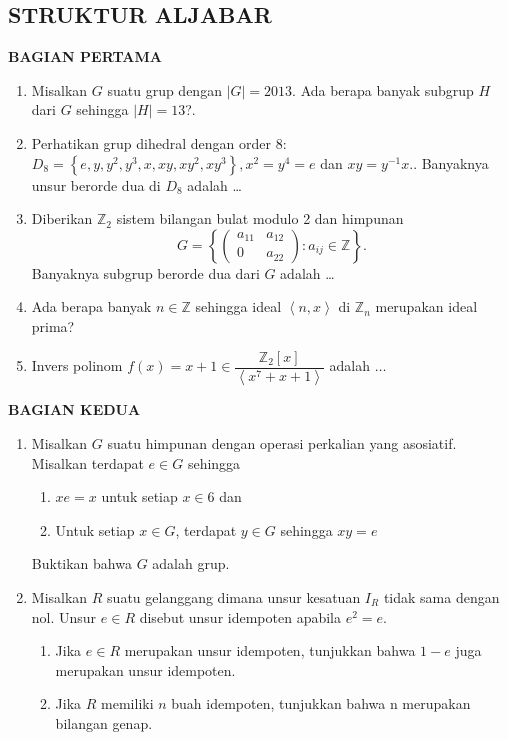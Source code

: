 \documentclass[12pt,twoside]{article}
\begin{document}
\subsection{STRUKTUR ALJABAR}
\textbf{BAGIAN PERTAMA}
\begin{enumerate}
	\item Misalkan $G$ suatu grup dengan $|G|=2013.$ Ada berapa banyak subgrup $H$ dari $G$ sehingga $|H|=13$?.

	\item Perhatikan grup dihedral dengan order 8: 	$D_8 = \left\lbrace e,y,y^2,y^3,x,xy,xy^2,xy^3 \right\rbrace, x^2=y^4=e$ dan $xy=y^{-1}x.$. Banyaknya unsur berorde dua di $D_8$ adalah \dots

	\item Diberikan $\mathbb{Z}_2$ sistem bilangan bulat modulo 2 dan himpunan $$G = \left\lbrace \left( \begin{array}{cc}
				      a_{11} & a_{12} \\0&a_{22}
			      \end{array}\right) : a_{ij} \in \mathbb{Z} \right\rbrace.$$ Banyaknya subgrup berorde dua dari $G$ adalah \dots

	\item Ada berapa banyak $n\in \mathbb{Z}$ sehingga ideal $\left< n,x \right>$ di $\mathbb{Z}_n$ merupakan ideal prima?

	\item Invers polinom $f(x) = x+1 \in \dfrac{\mathbb{Z}_{2}[x]}{\left<x^7 + x + 1\right>}$ adalah $\dots$

\end{enumerate}
\newpage \textbf{BAGIAN KEDUA}
\begin{enumerate}
	\item Misalkan $G$ suatu himpunan dengan operasi perkalian yang asosiatif. Misalkan terdapat $e \in G$ sehingga
	      \begin{enumerate}
		      \item[(a)] $xe=x$ untuk setiap $x \in 6$ dan
		      \item[(b)] Untuk setiap $x \in G$, terdapat $y \in G$ sehingga $xy=e$
	      \end{enumerate}
	      Buktikan bahwa $G$ adalah grup.


	\item Misalkan $R$ suatu gelanggang dimana unsur kesatuan $I_R$ tidak sama dengan nol. Unsur $e \in R$ disebut unsur idempoten apabila $e^2 = e$.
	      \begin{enumerate}
		      \item[(a)] Jika $e \in R$ merupakan unsur idempoten, tunjukkan bahwa $1-e$ juga merupakan unsur idempoten.
		      \item[(b)] Jika $R$ memiliki $n$ buah idempoten, tunjukkan bahwa n merupakan bilangan genap.
	      \end{enumerate}
\end{enumerate}
\pagebreak
\end{document}
